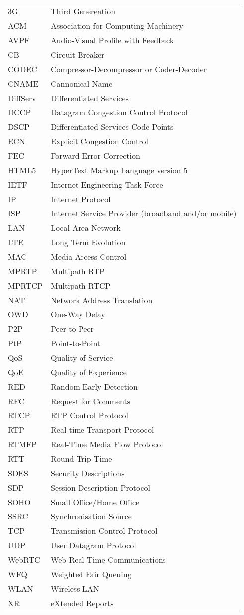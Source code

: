 \begin{longtable}{ll}
3G		& Third Genereation \\
ACM 	& Association for Computing Machinery \\
AVPF	& Audio-Visual Profile with Feedback \\
CB		& Circuit Breaker \\
CODEC	& Compressor-Decompressor or Coder-Decoder \\
CNAME	& Cannonical Name \\
DiffServ	& Differentiated Services \\
DCCP 	& Datagram Congestion Control Protocol \\
DSCP 	& Differentiated Services Code Points \\
ECN		& Explicit Congestion Control \\
FEC		& Forward Error Correction \\
HTML5	& HyperText Markup Language version 5\\
IETF	& Internet Engineering Task Force \\
IP		& Internet Protocol \\
ISP 	& Internet Service Provider (broadband and/or mobile)\\
LAN 	& Local Area Network \\
LTE 	& Long Term Evolution \\
MAC 	& Media Access Control \\
MPRTP 	& Multipath RTP \\
MPRTCP	& Multipath RTCP \\
NAT 	& Network Address Translation \\
OWD 	& One-Way Delay \\
P2P 	& Peer-to-Peer \\
PtP 	& Point-to-Point \\
QoS 	& Quality of Service \\
QoE 	& Quality of Experience \\
RED 	& Random Early Detection \\
RFC 	& Request for Comments \\
RTCP 	& RTP Control Protocol \\
RTP 	& Real-time Transport Protocol \\
RTMFP	& Real-Time Media Flow Protocol \\
RTT 	& Round Trip Time \\
SDES	& Security Descriptions \\
SDP 	& Session Description Protocol \\
SOHO 	& Small Office/Home Office \\
SSRC	& Synchronisation Source \\
TCP 	& Transmission Control Protocol \\
UDP 	& User Datagram Protocol \\
WebRTC	& Web Real-Time Communications \\
WFQ 	& Weighted Fair Queuing \\
WLAN	& Wireless LAN \\
XR		& eXtended Reports \\
\end{longtable}

